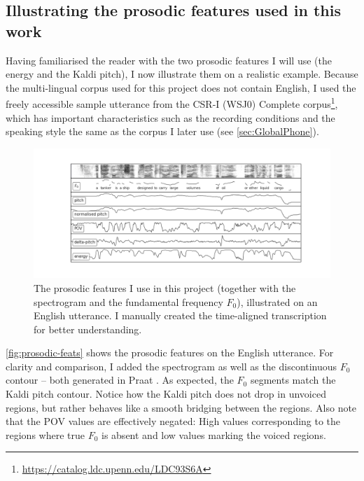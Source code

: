 \documentclass[bsc,frontabs,twoside,singlespacing,parskip,deptreport]{infthesis}
\begin{document}
{{    \subsection{Illustrating the prosodic features used in this work}{
      Having familiarised the reader with the two prosodic features I will use (the energy and the Kaldi pitch), I now illustrate them on a realistic example. Because the multi-lingual corpus used for this project does not contain English, I used the freely accessible sample utterance from the CSR-I (WSJ0) Complete corpus\footnote{\url{https://catalog.ldc.upenn.edu/LDC93S6A}}, which has important characteristics such as the recording conditions and the speaking style the same as the corpus I later use (see \autoref{sec:GlobalPhone}).
      \begin{figure}[h!]
        \centering
        \vspace{-1.2em}
        \hspace*{-2.4cm}
        \includegraphics[width=18.7cm]{../img/prosody_sample.png} %
        \vspace*{-3em}
        \caption{The prosodic features I use in this project (together with the spectrogram and the fundamental frequency $F_0$), illustrated on an English utterance. I manually created the time-aligned transcription for better understanding.}
        \label{fig:prosodic-feats}
      \end{figure}
      
      \autoref{fig:prosodic-feats} shows the prosodic features on the English utterance. For clarity and comparison, I added the spectrogram as well as the discontinuous $F_0$ contour -- both generated in Praat \citep{Praat}. As expected, the $F_0$ segments match the Kaldi pitch contour. Notice how the Kaldi pitch does not drop in unvoiced regions, but rather behaves like a smooth bridging between the regions. Also note that the POV values are effectively negated: High values corresponding to the regions where true $F_0$ is absent and low values marking the voiced regions.
    }
  }
}
\end{document}
